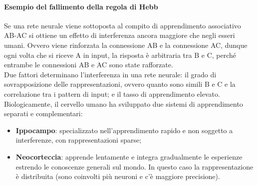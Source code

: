 \paragraph{Esempio del fallimento della regola di Hebb} Se una rete neurale
viene sottoposta al compito di apprendimento associativo AB-AC si ottiene un
effetto di interferenza ancora maggiore che negli esseri umani. Ovvero viene
rinforzata la connessione AB e la connessione AC, dunque ogni volta che si
riceve A in input, la risposta è arbitraria tra B e C, perché entrambe le
connessioni AB e AC sono state rafforzate.\\
Due fattori determinano l'interferenza in una rete neurale:
il grado di sovrapposizione delle rappresentazioni, ovvero quanto sono simili B
e C e la correlazione tra i pattern di input; e il tasso di apprendimento
elevato. Biologicamente, il cervello umano ha sviluppato due sistemi di
apprendimento separati e complementari:
\begin{itemize}
\item \textbf{Ippocampo}: specializzato nell'apprendimento rapido e non
soggetto a interferenze, con rappresentazioni sparse;
\item \textbf{Neocorteccia}: apprende lentamente e integra gradualmente le
esperienze estrendo le conoscenze generali sul mondo. In questo caso la
rappresentazione è distribuita (sono coinvolti più neuroni e c'è maggiore
precisione).
\end{itemize}
